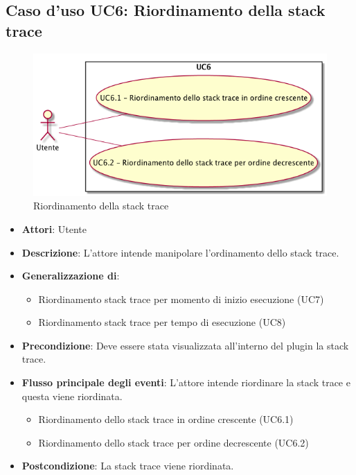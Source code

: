  \hypertarget{UC6}{}
\subsection{Caso d'uso UC6: Riordinamento della stack trace}
\begin{figure} [H]
	\centering
	\includegraphics[scale=0.45]{./UC/UC6.png}
	\caption{Riordinamento della stack trace}\label{}
\end{figure}
\begin{itemize}
	\item \textbf{Attori}: Utente
	\item \textbf{Descrizione}: L'attore intende manipolare l'ordinamento dello stack trace.
	\item 	\textbf{Generalizzazione di}:
	\begin{itemize}
		\item Riordinamento stack trace per momento di inizio esecuzione (UC7)
		\item Riordinamento stack trace per tempo di esecuzione (UC8)
	\end{itemize}
	\item \textbf{Precondizione}: Deve essere stata visualizzata all'interno del plugin la stack trace.
	\item \textbf{Flusso principale degli eventi}: L'attore intende riordinare la stack trace e questa viene riordinata.
	
	\begin{itemize}
		\item Riordinamento dello stack trace in ordine crescente (UC6.1)
		\item Riordinamento dello stack trace per ordine decrescente (UC6.2)
	\end{itemize}
	\item \textbf{Postcondizione}: La stack trace viene riordinata.
\end{itemize}
